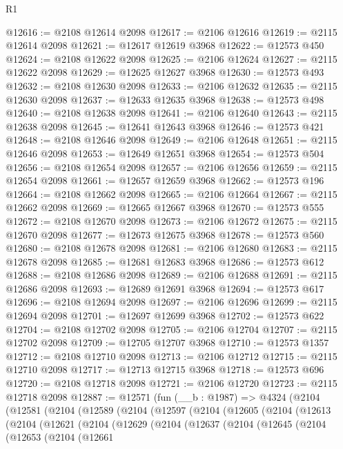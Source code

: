 \begin{lexlean}{R1}
\begin{coremodule}
@12616 := @2108 @12614 @2098
@12617 := @2106 @12616
@12619 := @2115 @12614 @2098
@12621 := @12617 @12619 @3968
@12622 := @12573 @450
@12624 := @2108 @12622 @2098
@12625 := @2106 @12624
@12627 := @2115 @12622 @2098
@12629 := @12625 @12627 @3968
@12630 := @12573 @493
@12632 := @2108 @12630 @2098
@12633 := @2106 @12632
@12635 := @2115 @12630 @2098
@12637 := @12633 @12635 @3968
@12638 := @12573 @498
@12640 := @2108 @12638 @2098
@12641 := @2106 @12640
@12643 := @2115 @12638 @2098
@12645 := @12641 @12643 @3968
@12646 := @12573 @421
@12648 := @2108 @12646 @2098
@12649 := @2106 @12648
@12651 := @2115 @12646 @2098
@12653 := @12649 @12651 @3968
@12654 := @12573 @504
@12656 := @2108 @12654 @2098
@12657 := @2106 @12656
@12659 := @2115 @12654 @2098
@12661 := @12657 @12659 @3968
@12662 := @12573 @196
@12664 := @2108 @12662 @2098
@12665 := @2106 @12664
@12667 := @2115 @12662 @2098
@12669 := @12665 @12667 @3968
@12670 := @12573 @555
@12672 := @2108 @12670 @2098
@12673 := @2106 @12672
@12675 := @2115 @12670 @2098
@12677 := @12673 @12675 @3968
@12678 := @12573 @560
@12680 := @2108 @12678 @2098
@12681 := @2106 @12680
@12683 := @2115 @12678 @2098
@12685 := @12681 @12683 @3968
@12686 := @12573 @612
@12688 := @2108 @12686 @2098
@12689 := @2106 @12688
@12691 := @2115 @12686 @2098
@12693 := @12689 @12691 @3968
@12694 := @12573 @617
@12696 := @2108 @12694 @2098
@12697 := @2106 @12696
@12699 := @2115 @12694 @2098
@12701 := @12697 @12699 @3968
@12702 := @12573 @622
@12704 := @2108 @12702 @2098
@12705 := @2106 @12704
@12707 := @2115 @12702 @2098
@12709 := @12705 @12707 @3968
@12710 := @12573 @1357
@12712 := @2108 @12710 @2098
@12713 := @2106 @12712
@12715 := @2115 @12710 @2098
@12717 := @12713 @12715 @3968
@12718 := @12573 @696
@12720 := @2108 @12718 @2098
@12721 := @2106 @12720
@12723 := @2115 @12718 @2098
@12887 := @12571
    (fun (__b : @1987) =>
    @4324
      (@2104
        (@12581
          (@2104
            (@12589
              (@2104
                (@12597
                  (@2104
                    (@12605
                      (@2104
                        (@12613
                          (@2104
                            (@12621
                              (@2104
                                (@12629
                                  (@2104
                                    (@12637
                                      (@2104
                                        (@12645
                                          (@2104
                                            (@12653
                                              (@2104
                                                (@12661

\end{coremodule}
\end{lexlean}
